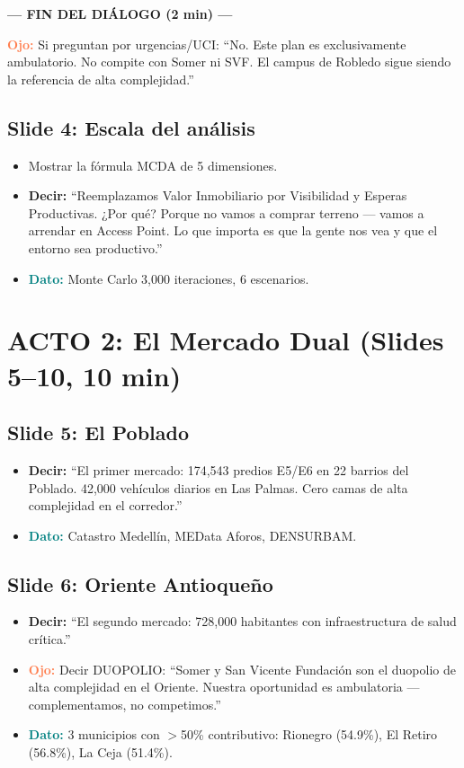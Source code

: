 \documentclass[11pt, a4paper]{article}
\newcommand{\slide}[2]{\subsection{Slide #1: #2}}
\newcommand{\say}[1]{\textcolor{hptu}{\textbf{Decir:}} ``#1''}
\newcommand{\dato}[1]{\textcolor{teal}{\textbf{Dato:}} #1}
\newcommand{\warn}[1]{\textcolor{coral}{\textbf{Ojo:}} #1}
\begin{document}
{\small\textcolor{hptu}{\textbf{--- FIN DEL DIÁLOGO (2 min) ---}}}

\vspace{4pt}
\warn{Si preguntan por urgencias/UCI: ``No. Este plan es exclusivamente ambulatorio. No compite con Somer ni SVF. El campus de Robledo sigue siendo la referencia de alta complejidad.''}

\slide{4}{Escala del análisis}
\begin{itemize}[leftmargin=1cm]
  \item Mostrar la fórmula MCDA de 5 dimensiones.
  \item \say{Reemplazamos Valor Inmobiliario por Visibilidad y Esperas Productivas. ¿Por qué? Porque no vamos a comprar terreno --- vamos a arrendar en Access Point. Lo que importa es que la gente nos vea y que el entorno sea productivo.}
  \item \dato{Monte Carlo 3,000 iteraciones, 6 escenarios.}
\end{itemize}

\section{ACTO 2: El Mercado Dual (Slides 5--10, 10 min)}

\slide{5}{El Poblado}
\begin{itemize}[leftmargin=1cm]
  \item \say{El primer mercado: 174,543 predios E5/E6 en 22 barrios del Poblado. 42,000 vehículos diarios en Las Palmas. Cero camas de alta complejidad en el corredor.}
  \item \dato{Catastro Medellín, MEData Aforos, DENSURBAM.}
\end{itemize}

\slide{6}{Oriente Antioqueño}
\begin{itemize}[leftmargin=1cm]
  \item \say{El segundo mercado: 728,000 habitantes con infraestructura de salud crítica.}
  \item \warn{Decir DUOPOLIO: ``Somer y San Vicente Fundación son el duopolio de alta complejidad en el Oriente. Nuestra oportunidad es ambulatoria --- complementamos, no competimos.''}
  \item \dato{3 municipios con $>$50\% contributivo: Rionegro (54.9\%), El Retiro (56.8\%), La Ceja (51.4\%).}
\end{itemize}
\end{document}
